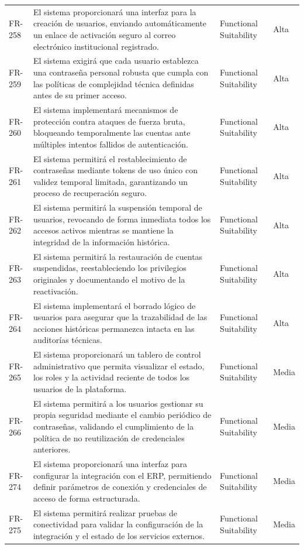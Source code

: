\begin{longtable}{>{\raggedright\arraybackslash}p{} >{\raggedright\arraybackslash}p{} >{\raggedright\arraybackslash}p{} >{\raggedright\arraybackslash}p{}}
FR-258 & El sistema proporcionará una interfaz para la creación de usuarios, enviando automáticamente un enlace de activación seguro al correo electrónico institucional registrado. & Functional Suitability & Alta \\
FR-259 & El sistema exigirá que cada usuario establezca una contraseña personal robusta que cumpla con las políticas de complejidad técnica definidas antes de su primer acceso. & Functional Suitability & Alta \\
FR-260 & El sistema implementará mecanismos de protección contra ataques de fuerza bruta, bloqueando temporalmente las cuentas ante múltiples intentos fallidos de autenticación. & Functional Suitability & Alta \\
FR-261 & El sistema permitirá el restablecimiento de contraseñas mediante tokens de uso único con validez temporal limitada, garantizando un proceso de recuperación seguro. & Functional Suitability & Alta \\
FR-262 & El sistema permitirá la suspensión temporal de usuarios, revocando de forma inmediata todos los accesos activos mientras se mantiene la integridad de la información histórica. & Functional Suitability & Alta \\
FR-263 & El sistema permitirá la restauración de cuentas suspendidas, reestableciendo los privilegios originales y documentando el motivo de la reactivación. & Functional Suitability & Alta \\
FR-264 & El sistema implementará el borrado lógico de usuarios para asegurar que la trazabilidad de las acciones históricas permanezca intacta en las auditorías técnicas. & Functional Suitability & Alta \\
FR-265 & El sistema proporcionará un tablero de control administrativo que permita visualizar el estado, los roles y la actividad reciente de todos los usuarios de la plataforma. & Functional Suitability & Media \\
FR-266 & El sistema permitirá a los usuarios gestionar su propia seguridad mediante el cambio periódico de contraseñas, validando el cumplimiento de la política de no reutilización de credenciales anteriores. & Functional Suitability & Media \\
FR-274 & El sistema proporcionará una interfaz para configurar la integración con el ERP, permitiendo definir parámetros de conexión y credenciales de acceso de forma estructurada. & Functional Suitability & Media \\
FR-275 & El sistema permitirá realizar pruebas de conectividad para validar la configuración de la integración y el estado de los servicios externos. & Functional Suitability & Media \\

\end{longtable}
